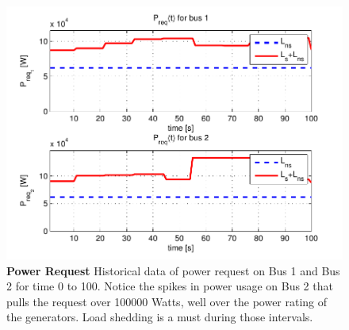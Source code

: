 \documentclass{acm_proc_article-sp}
\begin{document}
\label{sec:results}
\begin{figure}[htb]
  \centering
  \includegraphics[width=\columnwidth]{figures/preqnofail}
  \caption{\textbf{Power Request}
  Historical data of power request on Bus 1 and Bus 2 for time 0
  to 100. Notice the spikes in power usage on Bus 2 that pulls the
  request over 100000 Watts, well over the power rating of the generators.
  Load shedding is a must during those intervals.}
  \label{fig:preqnofail}
\end{figure}
\end{document}
